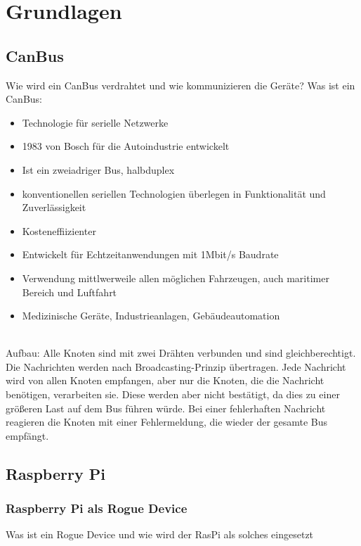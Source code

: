 \chapter{Grundlagen}


\section{CanBus}
Wie wird ein CanBus verdrahtet und wie kommunizieren die Geräte?
Was ist ein CanBus:
\begin{itemize}
    \item Technologie für serielle Netzwerke
    \item 1983 von Bosch für die Autoindustrie entwickelt
    \item Ist ein zweiadriger Bus, halbduplex
    \item konventionellen seriellen Technologien überlegen in Funktionalität und Zuverlässigkeit
    \item Kosteneffiizienter
    \item Entwickelt für Echtzeitanwendungen mit 1Mbit/s Baudrate
    \item Verwendung mittlwerweile allen möglichen Fahrzeugen, auch maritimer Bereich und Luftfahrt
    \item Medizinische Geräte, Industrieanlagen, Gebäudeautomation
\end{itemize}

\cite[Seiten 2-10]{voss2008comprehensible}
\\
Aufbau:
Alle Knoten sind mit zwei Drähten verbunden und sind gleichberechtigt.
\cite[Seite 132]{voss2008comprehensible}
\\
Die Nachrichten werden nach Broadcasting-Prinzip übertragen. Jede Nachricht wird von allen Knoten empfangen, 
aber nur die Knoten, die die Nachricht benötigen, verarbeiten sie. Diese werden aber nicht bestätigt,
da dies zu einer größeren Last auf dem Bus führen würde. Bei einer fehlerhaften Nachricht reagieren
die Knoten mit einer Fehlermeldung, die wieder der gesamte Bus empfängt.
\cite[Seite 80]{voss2008comprehensible}


\section{Raspberry Pi}

\subsection{Raspberry Pi als Rogue Device}
Was ist ein Rogue Device und wie wird der RasPi als solches eingesetzt